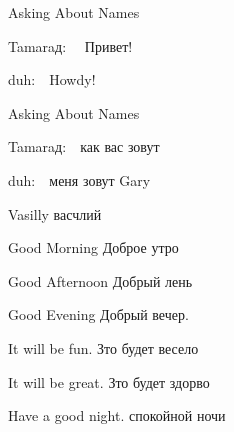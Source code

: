 \documentclass[avery5371,grid,frame]{flashcards}
\newcommand{\inR}[1]{\foreignlanguage{russian}{#1}}
\newcommand{\speakR}[1]{\item \foreignlanguage{russian}{#1}:\ \ }
\newcommand{\speakE}[1]{\item \foreignlanguage{english}{#1}:\ \ }
\newcommand{\aDlog}[1]{
  \begin{list}{\quad}{}
#1
  \end{list}}
\begin{document}
\newcommand{\theBack}[1]{
{\large
  \begin{center}
\vspace*{\fill}
#1
\vspace*{\fill}
  \end{center}
}}


\begin{flashcard}[]{Asking About Names}
\theBack{
\aDlog{
    \speakR{\inR{Tamaraд}} \inR{Привет!}
    \speakE{\inR{duh}}Howdy!
}}
\end{flashcard}




\begin{flashcard}[]{Asking About Names}
  \smallskip
\aDlog{
    \speakR{\inR{Tamaraд}}\inR{как вас зовут}
    \speakE{\inR{duh}}\inR{меня зовут Gary}
}
\end{flashcard}


\begin{flashcard}[Names]{Vasilly}
  \inR{васчлий}
\end{flashcard}


\begin{flashcard}[Greetings]{Good Morning}
  \smallskip
\inR{Доброе утро}
\end{flashcard}

\begin{flashcard}[Greetings]{Good Afternoon}
  \smallskip
\inR{Добрый лень}
\end{flashcard}

\begin{flashcard}[Greetings]{Good Evening}
  \smallskip
\inR{Добрый вечер.}
\end{flashcard}



\begin{flashcard}[Greetings]{It will be fun.}
  \smallskip
\inR{Зто будет весело}
\end{flashcard}



\begin{flashcard}[Greetings]{It will be great.}
  \smallskip
\inR{Зто будет здорво}
\end{flashcard}


\begin{flashcard}[Greetings]{Have a good night.}
  \smallskip
\inR{спокойной ночи}
\end{flashcard}
\end{document}
